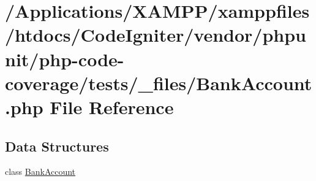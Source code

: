 \hypertarget{php-code-coverage_2tests_2__files_2_bank_account_8php}{}\section{/\+Applications/\+X\+A\+M\+P\+P/xamppfiles/htdocs/\+Code\+Igniter/vendor/phpunit/php-\/code-\/coverage/tests/\+\_\+files/\+Bank\+Account.php File Reference}
\label{php-code-coverage_2tests_2__files_2_bank_account_8php}
\subsection*{Data Structures}
\begin{DoxyCompactItemize}
\item 
class \mbox{\hyperlink{class_bank_account}{Bank\+Account}}
\end{DoxyCompactItemize}
